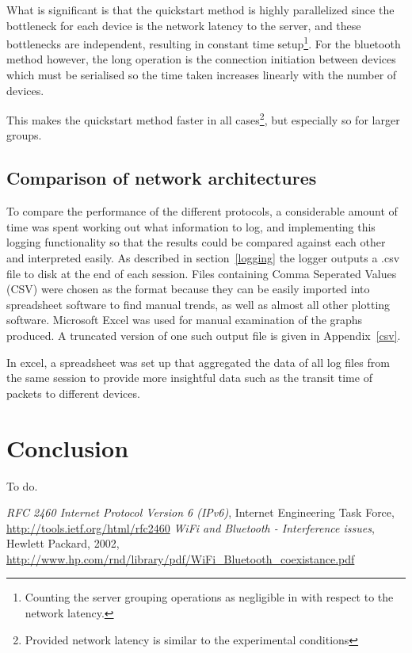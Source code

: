 What is significant is that the quickstart method is highly parallelized since the bottleneck for each device is the network latency to the server, and these bottlenecks are independent, resulting in constant time setup\footnote{Counting the server grouping operations as negligible in with respect to the network latency.}. For the bluetooth method however, the long operation is the connection initiation between devices which must be serialised so the time taken increases linearly with the number of devices.

This makes the quickstart method faster in all cases\footnote{Provided network latency is similar to the experimental conditions}, but especially so for larger groups.

\section{Comparison of network architectures}

To compare the performance of the different protocols, a considerable amount of time was spent working out what information to log, and implementing this logging functionality so that the results could be compared against each other and interpreted easily.
As described in section~\ref{logging} the logger outputs a .csv file to disk at the end of each session. Files containing Comma Seperated Values (CSV) were chosen as the format because they can be easily imported into spreadsheet software to find manual trends, as well as almost all other plotting software. Microsoft Excel was used for manual examination of the graphs produced.
A truncated version of one such output file is given in Appendix~\ref{csv}.

In excel, a spreadsheet was set up that aggregated the data of all log files from the same session to provide more insightful data such as the transit time of packets to different devices.

\cleardoublepage
\chapter{Conclusion}

To do.

\cleardoublepage



\begin{thebibliography}{9}
 \emph{RFC 2460 Internet Protocol Version 6 (IPv6)},
 Internet Engineering Task Force,
 \url{http://tools.ietf.org/html/rfc2460}
 \emph{WiFi and Bluetooth - Interference issues},
 Hewlett Packard, 2002,
 \url{http://www.hp.com/rnd/library/pdf/WiFi_Bluetooth_coexistance.pdf}
\end{thebibliography}


